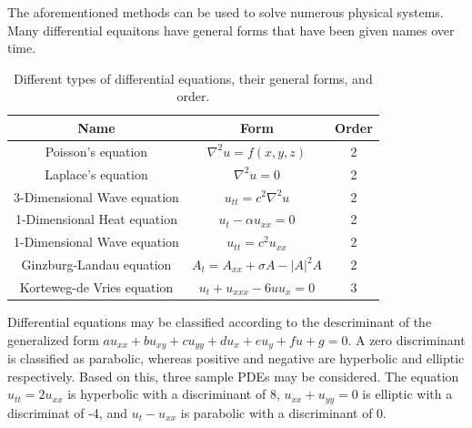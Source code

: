 \documentclass[twocolumn]{article}
\begin{document}
The aforementioned methods can be used to solve numerous physical systems. Many differential equaitons have general forms that have been given names over time.

\begin{table}
\begin{center}
\begin{tabular}{|c|c|c|}
	\hline Name                        & Form                                & Order \\ 
	\hline Poisson's equation          & $\nabla^2 u = f(x,y,z)$             & 2 \\ 
	\hline Laplace's equation          & $\nabla^2 u = 0$                    & 2 \\ 
	\hline 3-Dimensional Wave equation & $u_{tt} = c^2\nabla^2 u$            & 2 \\ 
	\hline 1-Dimensional Heat equation & $u_t -\alpha u_{xx} = 0$            & 2 \\ 
	\hline 1-Dimensional Wave equation & $u_{tt} = c^2 u_{xx} $              & 2 \\ 
	\hline Ginzburg-Landau equation    & $A_t = A_{xx} + \sigma A - |A|^2 A $& 2 \\ 
	\hline Korteweg-de Vries equation  & $u_t + u_{xxx} - 6u u_{x} = 0 $     & 3 \\ 
	\hline 
\end{tabular}  
\caption{Different types of differential equations, their general forms, and order.}
\label{eq:diff_equations}
\end{center}
\end{table}

Differential equations may be classified according to the descriminant of the generalized form $au_{xx} + bu_{xy} + cu_{yy} + du_{x} +eu_y +fu + g =0$. A zero discriminant is classified as parabolic, whereas positive and negative are hyperbolic and elliptic respectively. Based on this, three sample PDEs may be considered. The equation $u_{tt} = 2u_{xx}$ is hyperbolic with a discriminant of 8, $u_{xx} + u_{yy} = 0$ is elliptic with a discriminat of -4, and $u_t - u_{xx}$ is parabolic with a discriminant of 0.
\end{document}
